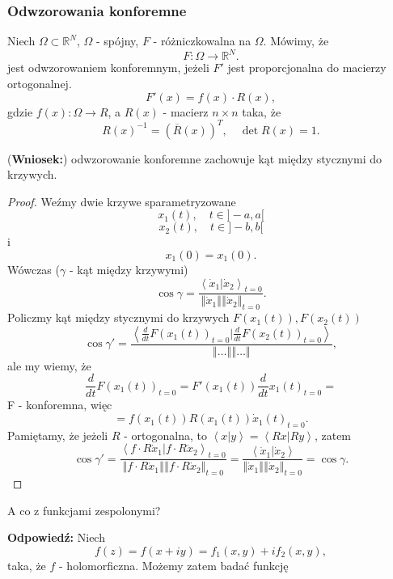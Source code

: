 \documentclass[../main.tex]{subfiles}
\begin{document}
    \subsubsection{Odwzorowania konforemne}
    \begin{definicja}
        Niech $\Omega \subset\mathbb{R}^N$, $\Omega$ - spójny, $F$ - różniczkowalna na $\Omega$. Mówimy, że
        \[
        F : \Omega \to \mathbb{R}^N
        .\]
    jest odwzorowaniem konforemnym, jeżeli $F'$ jest proporcjonalna do macierzy ortogonalnej.
    \[
        F'(x) = f(x) \cdot R(x)
    ,\]
gdzie $f(x) : \Omega \to R$, a $R(x)$ - macierz  $n\times n$ taka, że
 \[
     R(x)^{-1} = \left( \overline{R}(x) \right) ^T,\quad \det R(x) = 1
.\]
    \end{definicja}
    \begin{stw}
        (\textbf{Wniosek:}) odwzorowanie konforemne zachowuje kąt między stycznymi do krzywych.
    \end{stw}
    \begin{proof}
Weźmy dwie krzywe sparametryzowane
\[
    x_1(t),\quad t\in ]-a,a[
\]
\[
    x_2(t),\quad t\in ]-b,b[
\]
        i
        \[
            x_1(0) = x_1(0).
        \]
        Wówczas ($\gamma$ - kąt między krzywymi)
        \[
            \cos\gamma = \frac{\left<\dot{x}_1 | \dot{x}_2 \right>_{t=0}}{\left\Vert \dot{x}_1 \right\Vert \left\Vert \dot{x}_2 \right\Vert _{t=0}}
        .\]
    Policzmy kąt między stycznymi do krzywych $F(x_1(t)), F(x_2(t))$
    \[
        \cos\gamma' = \frac{\left<\frac{d}{dt}F(x_1(t))_{t=0} | \frac{d}{dt}F(x_2(t))_{t=0} \right>}{\left\Vert \ldots \right\Vert \left\Vert \ldots \right\Vert }
    ,\]
ale my wiemy, że
 \[
     \frac{d}{dt}F(x_1(t))_{t=0} = F'(x_1(t)) \frac{d}{dt}x_1(t)_{t=0}=
\]
F - konforemna, więc
\[
    = f(x_1(t))R(x_1(t))\dot{x}_1(t)_{t=0}
.\]
Pamiętamy, że jeżeli $R$ - ortogonalna, to $\left<x|y \right> = \left<Rx|Ry \right>$, zatem
\[
    \cos\gamma' = \frac{\left<f\cdot R\dot{x}_1 | f\cdot R\dot{x}_2 \right>_{t=0}}{\left\Vert f\cdot R\dot{x}_1 \right\Vert \left\Vert f\cdot R \dot{x}_2 \right\Vert_{t=0} } =
        \frac{\left<\dot{x}_1 | \dot{x}_2 \right>}{\left\Vert \dot{x}_1 \right\Vert \left\Vert \dot{x}_2 \right\Vert _{t=0}} = \cos\gamma
.\]
    \end{proof}
    \begin{pytanie}
        A co z funkcjami zespolonymi?
    \end{pytanie}
    \textbf{Odpowiedź: }Niech
    \[
        f(z) = f(x + iy) = f_1(x,y) + if_2(x,y)
    ,\]
taka, że $f$ - holomorficzna. Możemy zatem badać funkcję
\end{document}
